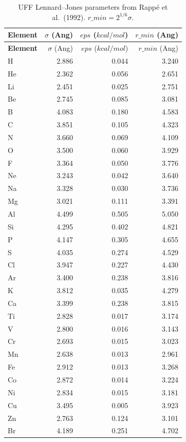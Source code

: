 \documentclass[11pt,twoside]{article}
\def\AA{Ang}%
\def\varepsilon{eps}%
\def\kcalmol{kcal/mol}%
\def\rmin{r\_min}%
\newcommand{\kcalmol}{\text{kcal/mol}}
\newcommand{\rmin}{r_{\mathrm{min}}}
\begin{document}
\begin{longtable}{lrrr}
\caption{UFF Lennard--Jones parameters from Rapp\'{e} et al.\ (1992). $\rmin = 2^{1/6}\sigma$.} \\
\toprule
\textbf{Element} & $\sigma$ (\AA) & $\varepsilon$ ($\kcalmol$) & $\rmin$ (\AA) \\
\midrule
\endfirsthead
\toprule
\textbf{Element} & $\sigma$ (\AA) & $\varepsilon$ ($\kcalmol$) & $\rmin$ (\AA) \\
\midrule
\endhead
H  & 2.886 & 0.044 & 3.240 \\
He & 2.362 & 0.056 & 2.651 \\
Li & 2.451 & 0.025 & 2.751 \\
Be & 2.745 & 0.085 & 3.081 \\
B  & 4.083 & 0.180 & 4.583 \\
C  & 3.851 & 0.105 & 4.323 \\
N  & 3.660 & 0.069 & 4.109 \\
O  & 3.500 & 0.060 & 3.929 \\
F  & 3.364 & 0.050 & 3.776 \\
Ne & 3.243 & 0.042 & 3.640 \\
Na & 3.328 & 0.030 & 3.736 \\
Mg & 3.021 & 0.111 & 3.391 \\
Al & 4.499 & 0.505 & 5.050 \\
Si & 4.295 & 0.402 & 4.821 \\
P  & 4.147 & 0.305 & 4.655 \\
S  & 4.035 & 0.274 & 4.529 \\
Cl & 3.947 & 0.227 & 4.430 \\
Ar & 3.400 & 0.238 & 3.816 \\
K  & 3.812 & 0.035 & 4.279 \\
Ca & 3.399 & 0.238 & 3.815 \\
Ti & 2.828 & 0.017 & 3.174 \\
V  & 2.800 & 0.016 & 3.143 \\
Cr & 2.693 & 0.015 & 3.023 \\
Mn & 2.638 & 0.013 & 2.961 \\
Fe & 2.912 & 0.013 & 3.268 \\
Co & 2.872 & 0.014 & 3.224 \\
Ni & 2.834 & 0.015 & 3.181 \\
Cu & 3.495 & 0.005 & 3.923 \\
Zn & 2.763 & 0.124 & 3.101 \\
Br & 4.189 & 0.251 & 4.702 \\

\end{longtable}
\end{document}
